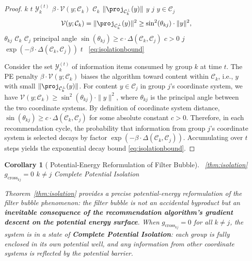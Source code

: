 \documentclass[11pt,a4paper]{article}
\newtheorem{corollary}[theorem]{Corollary}
\theoremstyle{remark}
\newcommand{\Y}{\mathcal{Y}}
\newcommand{\GCoupling}{g_{\text{cross}}}
\newcommand{\CoordSys}{\mathcal{C}}
\newcommand{\InfoPE}{\mathcal{V}}
\begin{document}
\begin{proof}
 $k$  $t$  $\Y_k^{(t)}$
 $\beta \cdot \InfoPE(y; \CoordSys_k)$  $\CoordSys_k$ 
 $\|\proj_{\CoordSys_k^\perp}(y)\|$  $y$
 $j$  $y \in \CoordSys_j$
\[
\InfoPE(y; \CoordSys_k) = \|\proj_{\CoordSys_k^\perp}(y)\|^2
\geq \sin^2(\theta_{kj}) \cdot \|y\|^2,
\]
 $\theta_{kj}$  $\CoordSys_k$  $\CoordSys_j$ principal angle
$\sin(\theta_{kj}) \geq c \cdot \Delta(\CoordSys_k, \CoordSys_j)$
 $c > 0$ 
 $j$ 
$\exp(-\beta \cdot \Delta(\CoordSys_k, \CoordSys_j))$ 
 $t$ ~\eqref{eq:isolationbound}

Consider the set $\Y_k^{(t)}$ of information items consumed by group $k$ at time $t$.
The PE penalty $\beta \cdot \InfoPE(y; \CoordSys_k)$ biases the algorithm toward content
within $\CoordSys_k$, i.e., $y$ with small $\|\proj_{\CoordSys_k^\perp}(y)\|$.
For content $y \in \CoordSys_j$ in group $j$'s coordinate system, we have
$\InfoPE(y; \CoordSys_k) \geq \sin^2(\theta_{kj}) \cdot \|y\|^2$,
where $\theta_{kj}$ is the principal angle between the two coordinate systems.
By definition of coordinate system distance,
$\sin(\theta_{kj}) \geq c \cdot \Delta(\CoordSys_k, \CoordSys_j)$ for some absolute
constant $c > 0$. Therefore, in each recommendation cycle, the probability that
information from group $j$'s coordinate system is selected decays by factor
$\exp(-\beta \cdot \Delta(\CoordSys_k, \CoordSys_j))$. Accumulating over $t$ steps
yields the exponential decay bound \eqref{eq:isolationbound}.
\end{proof}

\begin{corollary}[ Potential-Energy Reformulation of Filter Bubble]
\label{cor:filterbubble}
~\ref{thm:isolation} 
\textbf{}
 $\GCoupling_{kj} = 0$  $k \neq j$ 
\textbf{}Complete Potential Isolation



Theorem~\ref{thm:isolation} provides a precise potential-energy reformulation of the
filter bubble phenomenon: the filter bubble is not an accidental byproduct but an
\textbf{inevitable consequence of the recommendation algorithm's gradient descent on
the potential energy surface}. When $\GCoupling_{kj} = 0$ for all $k \neq j$, the
system is in a state of \textbf{Complete Potential Isolation}: each group is fully
enclosed in its own potential well, and any information from other coordinate systems
is reflected by the potential barrier.
\end{corollary}
\end{document}
